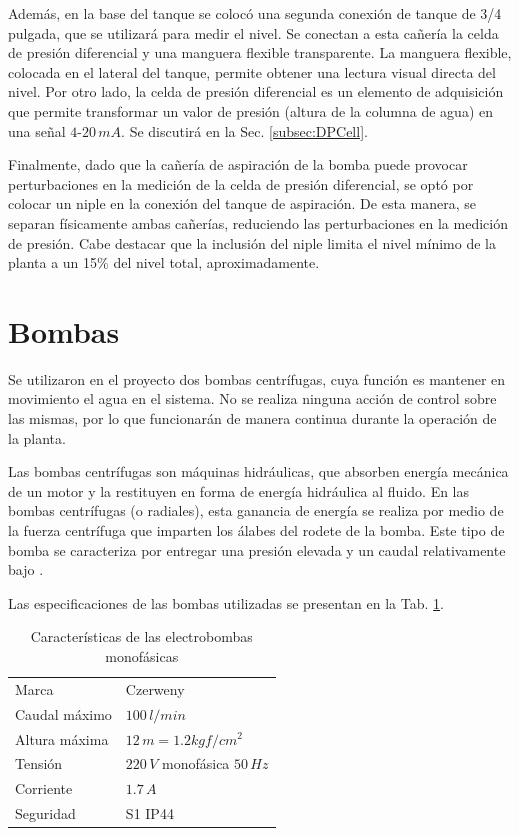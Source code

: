 Además, en la base del tanque se colocó una segunda conexión de tanque de 3/4
pulgada, que se utilizará para medir el nivel.
Se conectan a esta cañería la celda de presión diferencial y una manguera
flexible transparente.
La manguera flexible, colocada en el lateral del tanque, permite obtener una
lectura visual directa del nivel.
Por otro lado, la celda de presión diferencial es un elemento de adquisición
que permite transformar un valor de presión (altura de la columna de agua) en
una señal $4$-$20\,mA$.
Se discutirá en la Sec. \ref{subsec:DPCell}.

Finalmente, dado que la cañería de aspiración de la bomba puede provocar
perturbaciones en la medición de la celda de presión diferencial, se optó por
colocar un niple en la conexión del tanque de aspiración.
De esta manera, se separan físicamente ambas cañerías, reduciendo las
perturbaciones en la medición de presión.
Cabe destacar que la inclusión del niple limita el nivel mínimo de la planta a
un 15\% del nivel total, aproximadamente.

\section{Bombas}
\label{sec:Bombas}

Se utilizaron en el proyecto dos bombas centrífugas, cuya función es
mantener en movimiento el agua en el sistema.
No se realiza ninguna acción de control sobre las
mismas, por lo que funcionarán de manera continua durante la operación de la
planta.

Las bombas centrífugas son máquinas hidráulicas, que absorben energía mecánica
de un motor y la restituyen en forma de energía hidráulica al fluido.
En las bombas centrífugas (o radiales), esta ganancia de energía se realiza por
medio de la fuerza centrífuga que imparten los álabes del rodete de la bomba.
Este tipo de bomba se caracteriza por entregar una presión elevada y un caudal
relativamente bajo \cite{bib:Mataix}.

Las especificaciones de las bombas utilizadas se presentan en la Tab.
\ref{tab:caractBombas}.

\begin{table}[t]
\centering
\begin{tabular}{|l|l|}
\hline
Marca & Czerweny\\
Caudal máximo &  $100\,l/min$\\
Altura máxima &  $12\,m = 1.2 kgf/cm^2$\\
Tensión & $220\,V$ monofásica $50\,Hz$\\
Corriente & $1.7\,A$\\
Seguridad & S1 IP44\\
\hline
\end{tabular}
\caption{Características de las electrobombas monofásicas}
\label{tab:caractBombas}
\end{table}

